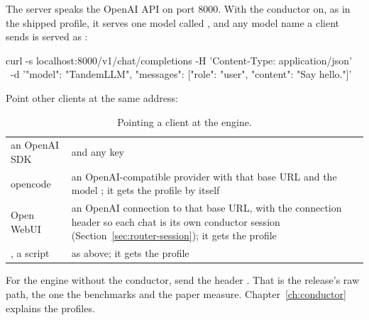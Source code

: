 The server speaks the OpenAI API on port 8000. With the conductor on, as in the shipped profile, it serves one model called , and any model name a client sends is served as :

\begin{shell}
curl -s localhost:8000/v1/chat/completions -H 'Content-Type: application/json' \
    -d '{"model": "TandemLLM", "messages": [{"role": "user", "content": "Say hello."}]}'
\end{shell}

Point other clients at the same address:

\begin{table}[htbp]
\centering\small
\caption{Pointing a client at the engine.}\label{tab:clients}
\begin{tabularx}{\linewidth}{@{}L{.2\linewidth}Y@{}}
\toprule
{} &  \\
\midrule
an OpenAI SDK &  and any key \\
opencode & an OpenAI-compatible provider with that base URL and the model ; it gets the  profile by itself \\
Open WebUI & an OpenAI connection to that base URL, with the connection header \code{X-OpenWebUI-Chat-Id: {{CHAT_ID}}} so each chat is its own conductor session (Section~\ref{sec:router-session}); it gets the  profile \\
\code{curl}, a script & as above; it gets the \code{general} profile \\
\bottomrule
\end{tabularx}
\end{table}

For the engine without the conductor, send the header . That is the release's raw path, the one the benchmarks and the paper measure. Chapter~\ref{ch:conductor} explains the profiles.



